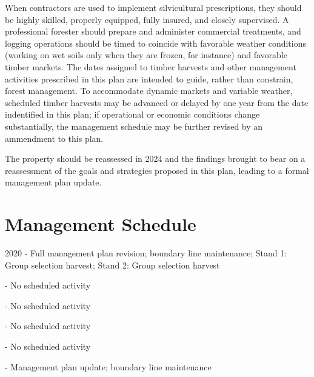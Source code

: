 \documentclass[]{tufte-handout}
\begin{document}
When contractors are used to implement silvicultural prescriptions, they
should be highly skilled, properly equipped, fully insured, and closely
supervised. A professional forester should prepare and administer
commercial treatments, and logging operations should be timed to
coincide with favorable weather conditions (working on wet soils only
when they are frozen, for instance) and favorable timber markets. The
dates assigned to timber harvests and other management activities
prescribed in this plan are intended to guide, rather than constrain,
forest management. To accommodate dynamic markets and variable weather,
scheduled timber harvests may be advanced or delayed by one year from
the date indentified in this plan; if operational or economic conditions
change substantially, the management schedule may be further revised by
an ammendment to this plan.

The property should be reassessed in 2024 and the findings brought to
bear on a reassessment of the goals and strategies proposed in this
plan, leading to a formal management plan update.

\newpage

\section{Management Schedule}\label{management-schedule}

\small 2020 - Full management plan revision; boundary line maintenance;
Stand 1: Group selection harvest; Stand 2: Group selection harvest

\vspace{5pt}

 - No scheduled activity

\vspace{5pt}

 - No scheduled activity

\vspace{5pt}

 - No scheduled activity

\vspace{5pt}

 - No scheduled activity

\vspace{5pt}

 - Management plan update; boundary line maintenance

\vspace{5pt}
\end{document}
